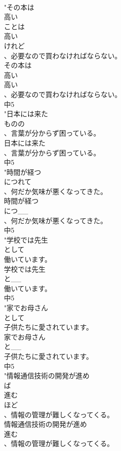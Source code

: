 \documentclass[8pt]{extreport}
\begin{document}
\begin{CJK}{UTF8}{min}
\\	"その本は
\\	高い
\\	ことは
\\	高い
\\	けれど
\\	、必要なので買わなければならない。
\\	その本は
\\	高い
\\	高い
\\	、必要なので買わなければならない。
\\	中5
\\	"日本には来た
\\	ものの
\\	、言葉が分からず困っている。
\\	日本には来た
\\	、言葉が分からず困っている。
\\	中5
\\	"時間が経つ
\\	につれて
\\	、何だか気味が悪くなってきた。
\\	時間が経つ
\\	につ__
\\	、何だか気味が悪くなってきた。
\\	中5
\\	"学校では先生
\\	として
\\	働いています。
\\	学校では先生
\\	と__
\\	働いています。
\\	中5
\\	"家でお母さん
\\	として
\\	子供たちに愛されています。
\\	家でお母さん
\\	と__
\\	子供たちに愛されています。
\\	中5
\\	"情報通信技術の開発が進め
\\	ば
\\	進む
\\	ほど
\\	、情報の管理が難しくなってくる。
\\	情報通信技術の開発が進め
\\	進む
\\	、情報の管理が難しくなってくる。

\end{CJK}
\end{document}
